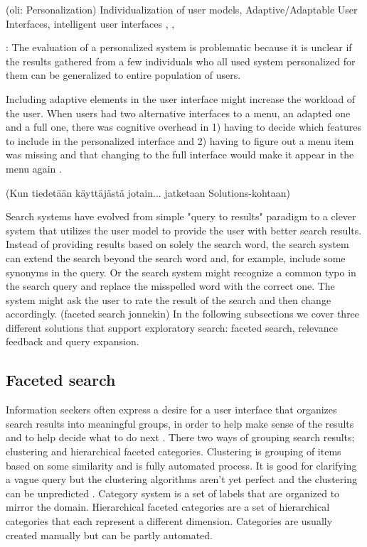 \documentclass{sigchi}
\begin{document}
 

(oli: Personalization)
Individualization of user models, Adaptive/Adaptable User Interfaces, intelligent user interfaces
\cite{bunt04}, \cite{findlater04}, \cite{brusi96}

\cite{van08}: The evaluation of a personalized system is problematic because it is unclear if the results gathered from a few individuals who all used system personalized for them can be generalized to entire population of users.

Including adaptive elements in the user interface might increase the workload of the user. When users had two alternative interfaces to a menu, an adapted one and a full one, there was cognitive overhead in 1) having to decide which features to include in the personalized interface and 2) having to figure out a menu item was missing and that changing to the full interface would make it appear in the menu again \cite{bunt04}.

(Kun tiedetään käyttäjästä jotain... jatketaan Solutions-kohtaan)

Search systems have evolved from simple "query to results" paradigm to a clever system that utilizes the user model to provide the user with better search results. Instead of providing results based on solely the search word, the search system can extend the search beyond the search word and, for example, include some synonyms in the query. Or the search system might recognize a common typo in the search query and replace the misspelled word with the correct one. The system might ask the user to rate the result of the search and then change accordingly. (faceted search jonnekin) In the following subsections we cover three different solutions that support exploratory search: faceted search, relevance feedback and query expansion.

\subsection{Faceted search}

Information seekers often express a desire for a user interface that organizes search results into meaningful groups, in order to help make sense of the results and to help decide what to do next \cite{hearst06}. There two ways of grouping search results; clustering and hierarchical faceted categories. Clustering is grouping of items based on some similarity and is fully automated process. It is good for clarifying a vague query but the clustering algorithms aren't yet perfect and the clustering can be unpredicted \cite{hearst06}. Category system is a set of labels that are organized to mirror the domain. Hierarchical faceted categories are a set of hierarchical categories that each represent a different dimension. Categories are usually created manually but can be partly automated. 
\end{document}

